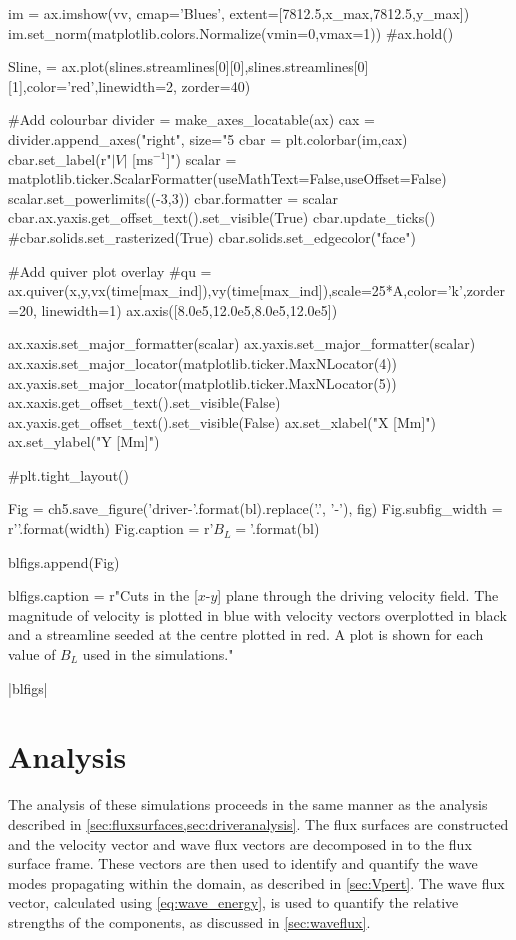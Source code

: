 \begin{pycode}[chapter5]
    im = ax.imshow(vv, cmap='Blues', extent=[7812.5,x_max,7812.5,y_max])
    im.set_norm(matplotlib.colors.Normalize(vmin=0,vmax=1))
    #ax.hold()

    Sline, = ax.plot(slines.streamlines[0][0],slines.streamlines[0][1],color='red',linewidth=2, zorder=40)

    #Add colourbar
    divider = make_axes_locatable(ax)
    cax = divider.append_axes("right", size="5%
    cbar = plt.colorbar(im,cax)
    cbar.set_label(r"$|V|$ [ms$^{-1}$]")
    scalar = matplotlib.ticker.ScalarFormatter(useMathText=False,useOffset=False)
    scalar.set_powerlimits((-3,3))
    cbar.formatter = scalar
    cbar.ax.yaxis.get_offset_text().set_visible(True)
    cbar.update_ticks()
    #cbar.solids.set_rasterized(True)
    cbar.solids.set_edgecolor("face")

    #Add quiver plot overlay
    #qu = ax.quiver(x,y,vx(time[max_ind]),vy(time[max_ind]),scale=25*A,color='k',zorder=20, linewidth=1)
    ax.axis([8.0e5,12.0e5,8.0e5,12.0e5])

    ax.xaxis.set_major_formatter(scalar)
    ax.yaxis.set_major_formatter(scalar)
    ax.xaxis.set_major_locator(matplotlib.ticker.MaxNLocator(4))
    ax.yaxis.set_major_locator(matplotlib.ticker.MaxNLocator(5))
    ax.xaxis.get_offset_text().set_visible(False)
    ax.yaxis.get_offset_text().set_visible(False)
    ax.set_xlabel("X [Mm]")
    ax.set_ylabel("Y [Mm]")

    #plt.tight_layout()

    Fig = ch5.save_figure('driver-{}'.format(bl).replace('.', '-'), fig)
    Fig.subfig_width = r'{}\columnwidth'.format(width)
    Fig.caption = r'$B_L = {}$'.format(bl)

    blfigs.append(Fig)

blfigs.caption = r"Cuts in the [$x$-$y$] plane through the driving velocity field. The magnitude of velocity is plotted in blue with velocity vectors overplotted in black and a streamline seeded at the centre plotted in red. A plot is shown for each value of $B_L$ used in the simulations."

\end{pycode}

\py[chapter5]|blfigs|

\section{Analysis}\label{sec:analysis}

The analysis of these simulations proceeds in the same manner as the analysis described in \cref{sec:fluxsurfaces,sec:driveranalysis}.
The flux surfaces are constructed and the velocity vector and wave flux vectors are decomposed in to the flux surface frame.
These vectors are then used to identify and quantify the wave modes propagating within the domain, as described in \cref{sec:Vpert}.
The wave flux vector, calculated using \cref{eq:wave_energy}, is used to quantify the relative strengths of the components, as discussed in \cref{sec:waveflux}.

